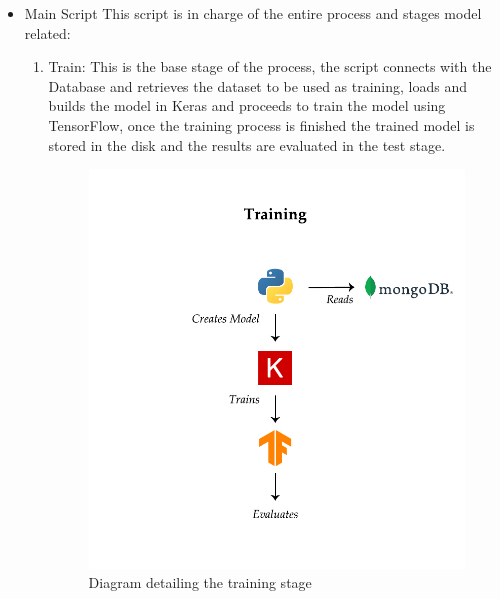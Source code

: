 \begin{itemize}
    
    \item Main Script This script is in charge of the entire process and stages model related:
    \begin{enumerate}
        
        \item Train: This is the base stage of the process, the script connects with the Database and retrieves the dataset to be used as training, loads and builds the model in Keras and proceeds to train the model using TensorFlow, once the training process is finished the trained model is stored in the disk and the results are evaluated in the test stage.
        \begin{figure}[th]
            \centering
            \includegraphics{Figures/TrainStage}
            \decoRule
            \caption[Train Stage]{Diagram detailing the training stage}
            \label{fig:Train Stage}
        \end{figure}
        

\end{enumerate}
\end{itemize}
